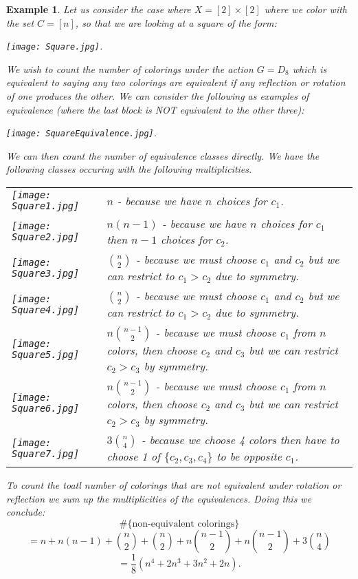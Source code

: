 \documentclass[11pt]{article}
\newtheorem{example}[theorem]{Example}
\begin{document}
\begin{example}
Let us consider the case where $X = [2] \times [2]$ where we color with the set $C=[n]$, so that we are looking at a square of the form:
\begin{center}
 \texttt{[image: Square.jpg]}.
\end{center}
We wish to count the number of colorings under the action $G=D_8$ which is equivalent to saying any two colorings are equivalent if any reflection or rotation of one produces the other. We can consider the following as examples of equivalence (where the last block is NOT equivalent to the other three):
\begin{center}
 \texttt{[image: SquareEquivalence.jpg]}.
\end{center}
We can then count the number of equivalence classes directly. We have the following classes occuring with the following multiplicities.

\begin{center}
\begin{tabular}{m{1.5in} m{2.5in}}
\texttt{[image: Square1.jpg]} & $n$ - because we have $n$ choices for $c_1$.\\
\texttt{[image: Square2.jpg]} & $n(n-1)$ - because we have $n$ choices for $c_1$ then $n-1$ choices for $c_2$.\\
\texttt{[image: Square3.jpg]} & ${n \choose 2}$ - because we must choose $c_1$ and $c_2$ but we can restrict to $c_1 > c_2$ due to symmetry.\\
\texttt{[image: Square4.jpg]} & ${n \choose 2}$ - because we must choose $c_1$ and $c_2$ but we can restrict to $c_1 > c_2$ due to symmetry.\\
\texttt{[image: Square5.jpg]} & $n {{n-1} \choose 2}$ - because we must choose $c_1$ from $n$ colors, then choose $c_2$ and $c_3$ but we can restrict $c_2 > c_3$ by \hspace{20pt} symmetry.\\
\texttt{[image: Square6.jpg]} & $n {{n-1} \choose 2}$ - because we must choose $c_1$ from $n$ colors, then choose $c_2$ and $c_3$ but we can restrict $c_2 > c_3$ by \hspace{20pt} symmetry.\\
\texttt{[image: Square7.jpg]} & $3 {n \choose 4}$ - because we choose 4 colors then have to choose 1 of $\{c_2,c_3,c_4 \}$ to be opposite $c_1$.\\
\end{tabular}
\end{center}

To count the toatl number of colorings that are not equivalent under rotation or reflection we sum up the multiplicities of the equivalences. Doing this we conclude:
	\[\# \{ \mbox{non-equivalent colorings} \}  \]
	\[= n + n(n-1) + {n \choose 2} + {n \choose 2} + n{{n-1} \choose 2} + n{{n-1} \choose 2} + 3{n \choose 4} \]
	\[=\frac{1}{8} (n^4 + 2n^3 + 3n^2 + 2n) .\]
\end{example}
\end{document}
